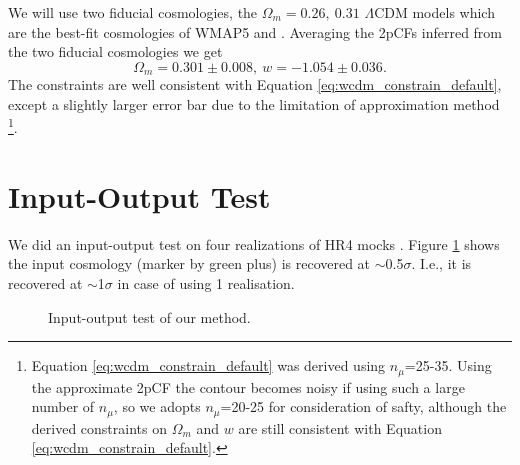 \documentclass[useAMS,usenatbib]{mnras}
\begin{document}
We will use two fiducial cosmologies,
the $\Omega_m=0.26,\ 0.31$ $\Lambda$CDM models which are the best-fit cosmologies of WMAP5 \cite{WMAP5} and \cite{Planck}.
Averaging the 2pCFs inferred from the two fiducial cosmologies we get
\begin{equation}
\Omega_m = 0.301 \pm 0.008,\ w=-1.054\pm 0.036.
\end{equation}
The constraints are well consistent with Equation \ref{eq:wcdm_constrain_default},
except a slightly larger error bar due to the limitation of approximation method
\footnote{Equation \ref{eq:wcdm_constrain_default} was derived using $n_{\mu}$=25-35.
Using the approximate 2pCF the contour becomes noisy if using such a large number of $n_\mu$,
so we adopts $n_\mu$=20-25 for consideration of safty, although the derived constraints on $\Omega_m$ and $w$ are still consistent with 
Equation \ref{eq:wcdm_constrain_default}.
}.



\section{Input-Output Test}

We did an input-output test on four realizations of HR4 mocks \cite{hr4}.
Figure \ref{fig_IO} shows the input cosmology (marker by green plus) is recovered at $\sim$0.5$\sigma$.
I.e., it is recovered at $\sim$1$\sigma$ in case of using 1 realisation.

\begin{figure}
   \caption{\label{fig_IO}
   Input-output test of our method.
   }
\end{figure}
\end{document}
